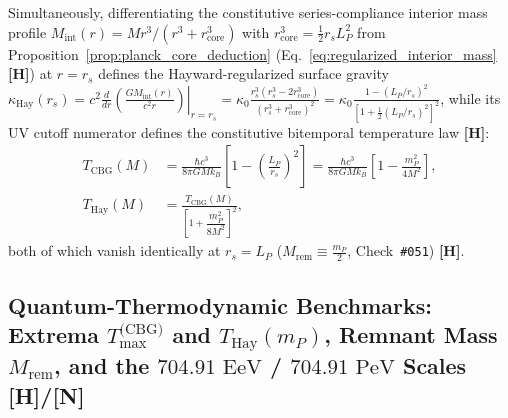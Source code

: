 \documentclass[11pt,a4paper]{article}
\newcommand{\catH}{\textbf{\textcolor{orange!85!black}{[H]}}}
\newcommand{\catN}{\textbf{\textcolor{teal!75!black}{[N]}}}
\theoremstyle{plain}
\theoremstyle{definition}
\theoremstyle{remark}
\numberwithin{equation}{section}
\begin{document}
Simultaneously, differentiating the constitutive series-compliance interior mass profile $M_{\text{int}}(r) = M r^3 / (r^3 + r_{\text{core}}^3)$ with $r_{\text{core}}^3 = \frac{1}{2}r_s L_P^2$ from Proposition~\ref{prop:planck_core_deduction} (Eq.~\ref{eq:regularized_interior_mass} \catH) at $r = r_s$ defines the Hayward-regularized surface gravity $\kappa_{\text{Hay}}(r_s) = c^2 \left.\frac{d}{dr}\left(\frac{GM_{\text{int}}(r)}{c^2 r}\right)\right|_{r = r_s} = \kappa_0 \frac{r_s^3(r_s^3 - 2r_{\text{core}}^3)}{(r_s^3 + r_{\text{core}}^3)^2} = \kappa_0 \frac{1 - (L_P/r_s)^2}{[1 + \frac{1}{2}(L_P/r_s)^2]^2}$, while its UV cutoff numerator defines the constitutive bitemporal temperature law \catH:
\begin{align}
T_{\text{CBG}}(M) &= \frac{\hbar c^{3}}{8\pi G M k_B} \left[ 1 - \left(\frac{L_P}{r_s}\right)^2 \right] = \frac{\hbar c^3}{8\pi G M k_B} \left[ 1 - \frac{m_P^2}{4 M^2} \right], \nonumber \\[4pt]
T_{\text{Hay}}(M) &= \frac{T_{\text{CBG}}(M)}{\left[1 + \dfrac{m_P^2}{8M^2}\right]^2},
\label{eq:modified_cbg_hawking_temp}
\end{align}
both of which vanish identically at $r_s = L_P$ ($M_{\text{rem}} \equiv \frac{m_P}{2}$, Check~\texttt{\#051}) \catH.

\subsection{\texorpdfstring{Quantum-Thermodynamic Benchmarks: Extrema $T_{\max}^{\text{(CBG)}}$ and $T_{\text{Hay}}(m_P)$, Remnant Mass $M_{\text{rem}}$, and the $704.91\text{ EeV}$ / $704.91\text{ PeV}$ Scales \catH/\catN}{Quantum-Thermodynamic Benchmarks: Extrema T_max, Remnant Mass M_rem, and the 704.91 EeV / 704.91 PeV Scales}}
\end{document}
